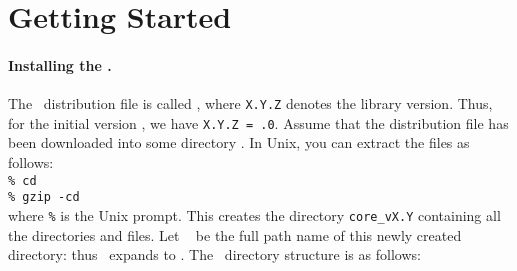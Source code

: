 \documentclass[12pt]{article}
\begin{document}
\section{Getting Started}

\paragraph{Installing the \corelib.}
The \core\ distribution file is called
\coredistfile, where {\tt X.Y.Z} denotes the library version.
Thus, for the initial version \versionNo, we have {\tt X.Y.Z = \versionNo.0}.
Assume that the distribution file has been downloaded into
some directory \installpath.  In Unix, you can extract
the files as follows:
\\
\hspace*{1in}  {\tt \% cd} \installpath
\\
\hspace*{1in}  {\tt \% gzip -cd} 
\\
where {\tt\%} is the Unix prompt.
This creates the directory {\tt core\_vX.Y} containing
all the directories and files.  Let \corepath\
be the full path name of this newly created directory:
thus \corepath\ expands to .
The \corelib\ directory structure is as follows:
\end{document}
